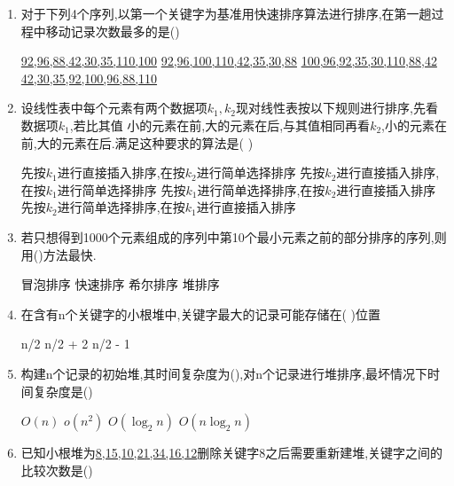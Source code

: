 \documentclass[12pt, a4paper, oneside, UTF8]{ctexbook}
\begin{document}
\begin{enumerate}
    \item 对于下列4个序列,以第一个关键字为基准用快速排序算法进行排序,在第一趟过程中移动记录次数最多的是()
    \begin{choices}[2]
        \task \underline{92,96,88,42,30,35,110,100}
        \task \underline{92,96,100,110,42,35,30,88}
        \task \underline{100,96,92,35,30,110,88,42}
        \task \underline{42,30,35,92,100,96,88,110}
    \end{choices}

    \item 设线性表中每个元素有两个数据项$k_1,k_2$现对线性表按以下规则进行排序,先看数据项$k_1$,若比其值
    小的元素在前,大的元素在后,与其值相同再看$k_2$,小的元素在前,大的元素在后.满足这种要求的算法是(   ) 
    \begin{choices}[1]
        \task 先按$k_1$进行直接插入排序,在按$k_2$进行简单选择排序
        \task 先按$k_2$进行直接插入排序,在按$k_1$进行简单选择排序
        \task 先按$k_1$进行简单选择排序,在按$k_2$进行直接插入排序
        \task 先按$k_2$进行简单选择排序,在按$k_1$进行直接插入排序
    \end{choices}



    \item 若只想得到1000个元素组成的序列中第10个最小元素之前的部分排序的序列,则用()方法最快. 
    \begin{choices}
        \task 冒泡排序
        \task 快速排序
        \task 希尔排序
        \task 堆排序
    \end{choices}
    

    \item 在含有n个关键字的小根堆中,关键字最大的记录可能存储在(   )位置 
    \begin{choices}
        \task n/2 
        \task n/2 + 2 
        \task n/2 - 1
    \end{choices}

    \item 构建n个记录的初始堆,其时间复杂度为(),对n个记录进行堆排序,最坏情况下时间复杂度是()
    \begin{choices}
        \task $O(n)$
        \task $o(n^2)$
        \task $O(\log_2{n})$
        \task $O(n\log_2{n})$
    \end{choices}



    \item 已知小根堆为\underline{8,15,10,21,34,16,12}删除关键字8之后需要重新建堆,关键字之间的比较次数是()
    \begin{choices}
    \end{choices}


\end{enumerate}
\end{document}
